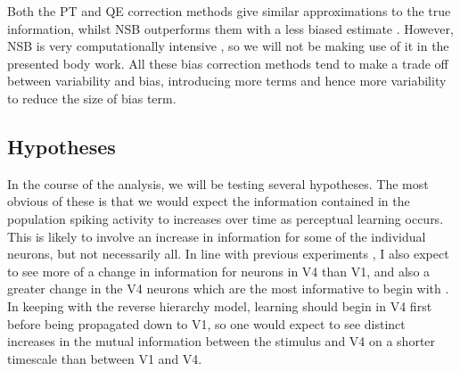 Both the PT and QE correction methods give similar approximations to the true information, whilst NSB outperforms them with a less biased estimate \cite{Panzeri2007}. However, NSB is very computationally intensive \cite{Panzeri2007}, so we will not be making use of it in the presented body work.
All these bias correction methods tend to make a trade off between variability and bias, introducing more terms and hence more variability to reduce the size of bias term.








\subsection{Hypotheses}

In the course of the analysis, we will be testing several hypotheses.
The most obvious of these is that we would expect the information contained in the population spiking activity to increases over time as perceptual learning occurs. This is likely to involve an increase in information for some of the individual neurons, but not necessarily all.
In line with previous experiments \cite{Raiguel2006}, I also expect to see more of a change in information for neurons in V4 than V1, and also a greater change in the V4 neurons which are the most informative to begin with \cite{Raiguel2006}.
In keeping with the reverse hierarchy model, learning should begin in V4 first before being propagated down to V1, so one would expect to see distinct increases in the mutual information between the stimulus and V4 on a shorter timescale than between V1 and V4.

